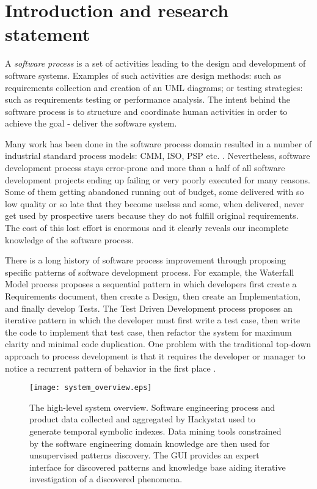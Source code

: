 \chapter{Introduction and research statement}
A \textit{software process} is a set of activities leading to the design and development of software systems. Examples of such activities are design methods: such as requirements collection and creation of an UML diagrams; or testing strategies: such as requirements testing or performance analysis. The intent behind the software process is to structure and coordinate human activities in order to achieve the goal - deliver the software system. 

Many work has been done in the software process domain resulted in a number of industrial standard process models: CMM, ISO, PSP etc. \cite{citeulike:5043104}. Nevertheless, software development process stays error-prone and more than a half of all software development projects ending up failing or very poorly executed for many reasons. Some of them getting abandoned running out of budget, some delivered with so low quality or so late that they become useless and some, when delivered, never get used by prospective users because they do not fulfill original requirements. The cost of this lost effort is enormous and it clearly reveals our incomplete knowledge of the software process.

There is a long history of software process improvement through proposing specific patterns of software development process. For example, the Waterfall Model process proposes a sequential pattern in which developers first create a Requirements document, then create a Design, then create an Implementation, and finally develop Tests. The Test Driven Development process proposes an iterative pattern in which the developer must first write a test case, then write the code to implement that test case, then refactor the system for maximum clarity and minimal code duplication. One problem with the traditional top-down approach to process development is that it requires the developer or manager to notice a recurrent pattern of behavior in the first place \cite{citeulike:5043104}. 


\begin{figure}[tbp]
   \centering
   \texttt{[image: system\_overview.eps]}
   \caption{The high-level system overview. Software engineering process and product data collected and aggregated by Hackystat used to generate temporal symbolic indexes. Data mining tools constrained by the software engineering domain knowledge are then used for unsupervised patterns discovery. The GUI provides an expert interface for discovered patterns and knowledge base aiding iterative investigation of a discovered phenomena.}
   \label{fig:system_overview}
\end{figure}


